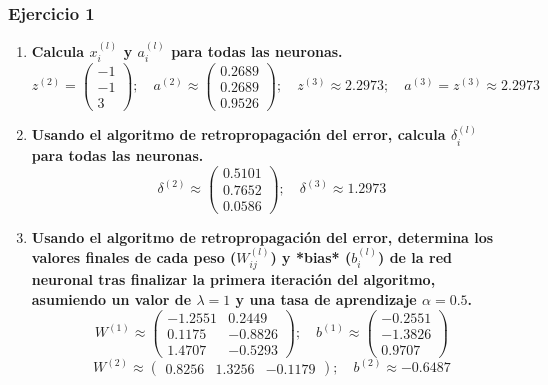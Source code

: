 \documentclass[11pt]{article}
\begin{document}
\subsubsection*{Ejercicio 1}

\begin{enumerate}
\item \textbf{Calcula $x_i^{(l)}$ y $a_i^{(l)}$ para todas las neuronas.}
\begin{equation}
z^{(2)} =
\begin{pmatrix}
-1 \\
-1 \\
3
\end{pmatrix}; \quad 
a^{(2)} \approx
\begin{pmatrix}
0.2689 \\
0.2689 \\
0.9526
\end{pmatrix}; \quad 
z^{(3)} \approx 2.2973; \quad a^{(3)} = z^{(3)} \approx 2.2973
\end{equation}
\item \textbf{Usando el algoritmo de retropropagación del error, calcula $\delta_i^{(l)}$ para todas las neuronas.}
\begin{equation}
\delta^{(2)} \approx
\begin{pmatrix}
0.5101 \\
0.7652 \\
0.0586
\end{pmatrix}; \quad 
\delta^{(3)} \approx 1.2973
\end{equation}
\item \textbf{Usando el algoritmo de retropropagación del error, determina los valores finales de cada peso ($W_{ij}^{(l)}$) y *bias* ($b_i^{(l)}$) de la red neuronal tras finalizar la primera iteración del algoritmo, asumiendo un valor de $\lambda = 1$ y una tasa de aprendizaje $\alpha = 0.5$.}
\begin{equation}
W^{(1)} \approx
\begin{pmatrix}
-1.2551 & 0.2449 \\
0.1175 & -0.8826 \\
1.4707 & -0.5293
\end{pmatrix}; \quad 
b^{(1)} \approx 
\begin{pmatrix}
-0.2551 \\
-1.3826 \\
0.9707 
\end{pmatrix}
\end{equation}
\begin{equation}
W^{(2)} \approx
\begin{pmatrix}
0.8256 & 1.3256 & -0.1179
\end{pmatrix}; \quad 
b^{(2)} \approx -0.6487
\end{equation}
\end{enumerate}
\end{document}
